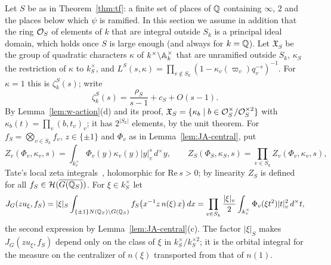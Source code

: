 Let $S$ be as in Theorem~\ref{thm:tf}: a finite set of places of $\mathbb{Q}$
containing $\infty$, $2$ and the places below which $\psi$ is ramified.
In this section we assume in addition that the ring $\mathcal{O}_S$ of
elements of $k$ that are integral outside $S_k$ is a principal ideal
domain, which holds once $S$ is large enough (and always for $k=\mathbb{Q}$).
Let $\mathfrak X_S$ be the group of quadratic characters $\kappa$ of
$k^\times\backslash\mathbb{A}_k^\times$ that are unramified outside $S_k$,
$\kappa_S$ the restriction of $\kappa$ to $k_S^\times$, and
$L^S(s,\kappa)=\prod_{v\notin S_k}(1-\kappa_v(\varpi_v)q_v^{-s})^{-1}$. For
$\kappa=1$ this is $\zeta_k^S(s)$; write
\[
\zeta_k^S(s)=\frac{\rho_S}{s-1}+c_S+O(s-1).
\]
By Lemma~\ref{lem:w-action}(d) and its proof, $\mathfrak X_S=\{\kappa_b
\mid b\in\mathcal{O}_S^\times/\mathcal{O}_S^{\times2}\}$ with $\kappa_b(t)=\prod_v(b,t_v)_v$;
it has $2^{|S_k|}$ elements, by the unit theorem. For $f_S=\bigotimes_{v
\in S_k}f_v$, $z\in\{\pm1\}$ and $\Phi_v$ as in
Lemma~\ref{lem:JA-central}, put
\[
Z_v(\Phi_v,\kappa_v,s)=\int_{k_v^\times}\Phi_v(y)\kappa_v(y)|y|_v^s\,d^\times y,
\qquad Z_S(\Phi_S,\kappa_S,s)=\prod_{v\in S_k}Z_v(\Phi_v,\kappa_v,s),
\]
Tate's local zeta integrals~\cite{Ta67}, holomorphic for $\mathrm{Re}\,s>0$;
by linearity $Z_S$ is defined for all $f_S\in\mathcal H(\overline{G(\mathbb{Q}_S)})$. For
$\xi\in k_S^\times$ let
\begin{equation}\label{eq:JG-unip}
J_G(zu_\xi,f_S)=|\xi|_S\int_{\{\pm1\}N(\mathbb{Q}_S)\backslash G(\mathbb{Q}_S)}
f_S\bigl(x^{-1}z\,n(\xi)\,x\bigr)\,dx
=\prod_{v\in S_k}\frac{|\xi|_v}2\int_{k_v^\times}\Phi_v(\xi t^2)|t|_v^2\,
d^\times t,
\end{equation}
the second expression by Lemma~\ref{lem:JA-central}(c). The factor
$|\xi|_S$ makes $J_G(zu_\xi,f_S)$ depend only on the class of $\xi$ in
$k_S^\times/k_S^{\times2}$; it is the orbital integral for the measure on
the centralizer of $n(\xi)$ transported from that of $n(1)$.

